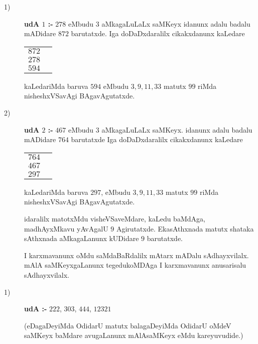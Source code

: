 \begin{description}
\item[{\rm 1)}] {\bf udA $1$ :-} $278$ eMbudu $3$ aMkagaLuLaLx saMKeyx idanunx adalu badalu mADidare $872$ barutatxde. Iga doDaDxdaralilx cikakxdanunx kaLedare
    \begin{center}
\begin{tabular}{cc}
  $872$&\\
  $278$&\\\cline{1-1}
  $594$&
\end{tabular}
    \end{center}
    kaLedariMda baruva $594$ eMbudu $3, 9, 11, 33$ matutx $99$ riMda nisheshxVSavAgi BAgavAgutatxde.
    
  \item[{\rm 2)}]  {\bf udA $2$ :-} $467$ eMbudu $3$ aMkagaLuLaLx saMKeyx. idanunx adalu badalu mADidare $764$ barutatxde Iga doDaDxdaralilx cikakxdanunx kaLedare
        \begin{center}
\begin{tabular}{cc}
  $764$&\\
  $467$&\\\cline{1-1}
  $297$&
\end{tabular}
        \end{center}
        kaLedariMda baruva $297$, eMbudu  $3, 9, 11, 33$ matutx $99$ riMda nisheshxVSavAgi BAgavAgutatxde.

        idaralilx matotxMdu visheVSaveMdare, kaLedu baMdAga, madhAyxMkavu yAvAgalU $9$ Agirutatxde. EkasAthxnada matutx shataka sAthxnada aMkagaLanunx kUDidare $9$ barutatxde.

        I karxmavanunx oMdu saMdaBaRdalilx mAtarx mADalu sAdhayxvilalx. mAlA saMKeyxgaLanunx tegedukoMDAga I karxmavanunx anusarisalu sAdhayxvilalx.
\end{description}

        \begin{description}
        \item[{\rm 1)}] {\bf udA :-} $222$, $303$, $444$, $12321$

          (eDagaDeyiMda OdidarU matutx balagaDeyiMda OdidarU oMdeV saMKeyx baMdare avugaLanunx mAlAsaMKeyx eMdu kareyuvudide.)
        \end{description}
        
  



